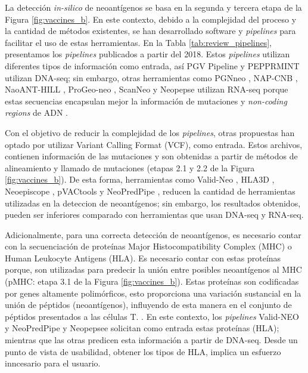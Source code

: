 \documentclass[a4paper,11pt]{article}
\begin{document}
	
La detección \textit{in-silico} de neoantígenos se basa en la segunda y tercera etapa de la Figura \ref{fig:vaccines_b}. En este contexto, debido a la complejidad del proceso y la cantidad de métodos existentes, se han desarrollado software y \textit{pipelines} para facilitar el uso de estas herramientas. En la Tabla \ref{tab:review_pipelines}, presentamos los \textit{pipelines} publicados a partir del 2018. Estos \textit{pipelines} utilizan diferentes tipos de información como entrada, así PGV Pipeline \citep{rubinsteyn2018computational} y PEPPRMINT \citep{zhou2023prioritizing} utilizan DNA-seq; sin embargo, otras herramientas como PGNneo \citep{tan2023pgnneo}, NAP-CNB \citep{wert2021predicting}, NaoANT-HILL \citep{coelho2020neoant}, ProGeo-neo \citep{li2020progeo}, ScanNeo \citep{wang2019scanneo} y Neopepse \citep{kim2018neopepsee} utilizan RNA-seq porque estas secuencias encapsulan mejor la información de mutaciones y \textit{non-coding regions} de ADN \citep{tan2023pgnneo}. 

Con el objetivo de reducir la complejidad de los \textit{pipelines}, otras propuestas han optado por utilizar Variant Calling Format (VCF), como entrada. Estos archivos, contienen información de las mutaciones y son obtenidas a partir de métodos de alineamiento y llamado de mutaciones (etapas 2.1 y 2.2 de la Figura \ref{fig:vaccines_b}). De esta forma, herramientas como Valid-Neo \citep{terai2022valid}, HLA3D \citep{li2022hla3d}, Neoepiscope \citep{wood2020neoepiscope} , pVACtools \citep{hundal2020pvactools} y NeoPredPipe \citep{schenck2019neopredpipe}, reducen la cantidad de herramientas utilizadas en la deteccion de neoantígenos; sin embargo, los resultados obtenidos, pueden ser inferiores comparado con herramientas que usan DNA-seq y RNA-seq.

Adicionalmente, para una correcta detección de neoantígenos, es necesario contar con la secuenciación de proteínas Major Histocompatibility Complex (MHC) o Human Leukocyte Antigens (HLA). Es necesario contar con estas proteínas porque, son utilizadas para predecir la unión entre posibles neoantígenos al MHC (pMHC: etapa 3.1 de la Figura \ref{fig:vaccines_b}). Estas proteínas son codificadas por genes altamente polimórficos, esto proporciona una variación sustancial en la unión de péptidos (neoantígenos), influyendo de esta manera en el conjunto de péptidos presentados a las células T. \citep{abualrous2021major}. En este contexto,  los \textit{pipelines} Valid-NEO \citep{terai2022valid}  y NeoPredPipe \citep{schenck2019neopredpipe} y Neopepsee \citep{kim2018neopepsee} solicitan como entrada estas proteínas (HLA); mientras que las otras predicen esta información a partir de DNA-seq. Desde un punto de vista de usabilidad, obtener los tipos de HLA, implica un esfuerzo inncesario para el usuario.
\end{document}
